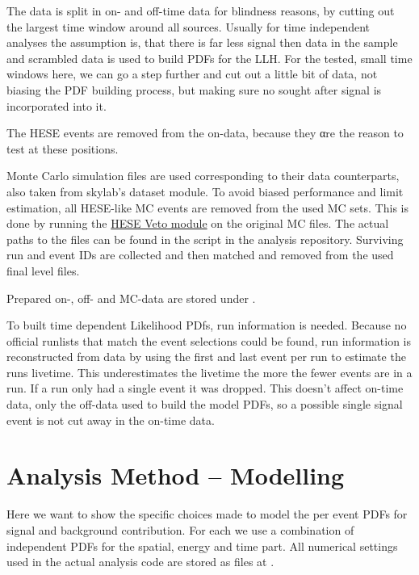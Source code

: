 The data is split in on- and off-time data for blindness reasons, by cutting out the largest time window around all sources.
Usually for time independent analyses the assumption is, that there is far less signal then data in the sample and scrambled data is used to build PDFs for the LLH.
For the tested, small time windows here, we can go a step further and cut out a little bit of data, not biasing the PDF building process, but making sure no sought after signal is incorporated into it.

The HESE events are removed from the on-data, because they αre the reason to test at these positions.

Monte Carlo simulation files are used corresponding to their data counterparts, also taken from skylab's dataset module.
To avoid biased performance and limit estimation, all HESE-like MC events are removed from the used MC sets.
This is done by running the \href{http://software.icecube.wisc.edu/documentation/projects/VHESelfVeto/index.html}{HESE Veto module} on the original MC  files.
The actual paths to the files can be found in the script  in the analysis repository.
Surviving run and event IDs are collected and then matched and removed from the used final level files.

Prepared on-, off- and MC-data are stored under .

To built time dependent Likelihood PDfs, run information is needed.
Because no official runlists that match the event selections could be found, run information is reconstructed from data by using the first and last event per run to estimate the runs livetime.
This underestimates the livetime the more the fewer events are in a run.
If a run only had a single event it was dropped.
This doesn't affect on-time data, only the off-data used to build the model PDFs, so a possible single signal event is not cut away in the on-time data.







\section{Analysis Method – Modelling}
Here we want to show the specific choices made to model the per event PDFs for signal and background contribution.
For each we use a combination of independent PDFs for the spatial, energy and time part.
All numerical settings used in the actual analysis code are stored as  files at .

